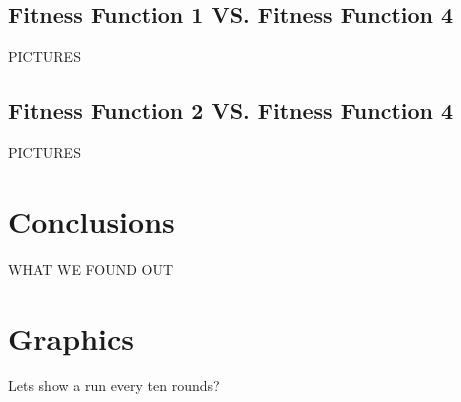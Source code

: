 \documentclass{acm_proc_article-sp}
\begin{document}
\subsection{Fitness Function 1 VS. Fitness Function 4}

PICTURES

\subsection{Fitness Function 2 VS. Fitness Function 4}

PICTURES

\section{Conclusions} %

WHAT WE FOUND OUT

%

%
%



\appendix
\section{Graphics}

Lets show a run every ten rounds?

\end{document}
